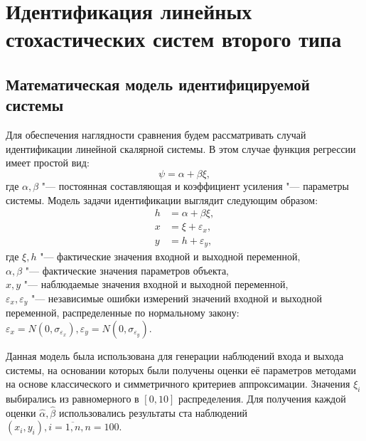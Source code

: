 \chapter[Идентификация линейных стохастических систем второго типа]{%
  Идентификация линейных стохастических систем второго типа
}

\section{Математическая модель идентифицируемой системы}

Для обеспечения наглядности сравнения будем рассматривать случай
идентификации линейной скалярной системы.
В этом случае функция регрессии имеет простой вид:
\begin{equation}
  \psi = \alpha + \beta \xi,
  \label{eq:linear_fun_scalar}
\end{equation}
где \( \alpha, \beta \) "--- постоянная составляющая и коэффициент усиления "---
параметры системы. Модель задачи идентификации выглядит следующим образом:
\begin{equation}
  \label{eq:linear_model_scalar}
  \begin{aligned}
  h &= \alpha + \beta \xi, \\
  x &= \xi + \varepsilon_x, \\
  y &= h + \varepsilon_y,
  \end{aligned}
\end{equation}
где \( \xi, h \) "--- фактические значения входной и выходной переменной, \\
\hspace*{6mm} \( \alpha, \beta \) "--- фактические значения параметров объекта, \\
\hspace*{6mm} \( x, y \) "--- наблюдаемые значения входной и выходной переменной, \\
\hspace*{5mm} \( \varepsilon_x, \varepsilon_y \) "--- независимые ошибки измерений значений
входной и выходной переменной, распределенные по нормальному закону:
\(
\varepsilon_x = N(0, \sigma_{\varepsilon_x}),
\varepsilon_y = N(0, \sigma_{\varepsilon_y})
\).

Данная модель была использована для генерации наблюдений входа и выхода системы,
на основании которых были получены оценки её параметров методами на основе
классического и симметричного критериев аппроксимации.
Значения \( \xi_i \) выбирались из равномерного в \( [0, 10] \) распределения.
Для получения каждой оценки \( \hat{\alpha}, \hat{\beta} \) использовались результаты
ста наблюдений \( ( x_i, y_i ), i = \overline{1, n}, n = 100 \).

